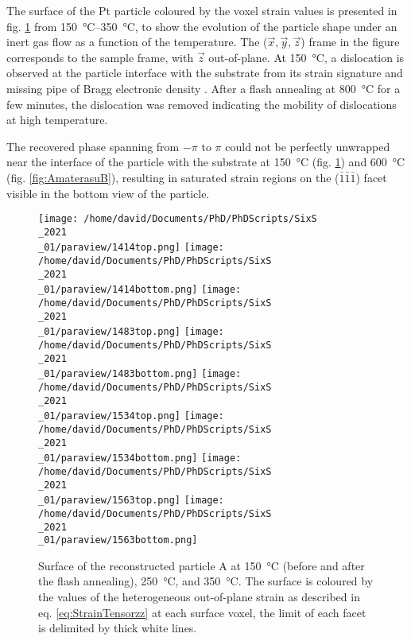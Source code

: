 The surface of the Pt particle coloured by the voxel strain values is presented in fig. \ref{fig:AmaterasuA} from \qtyrange{150}{350}{\degreeCelsius}, to show the evolution of the particle shape under an inert gas flow as a function of the temperature.
The ($\vec{x}, \vec{y}, \vec{z}$) frame in the figure corresponds to the sample frame, with $\vec{z}$ out-of-plane.
At \qty{150}{\degreeCelsius}, a dislocation is observed at the particle interface with the substrate from its strain signature and missing pipe of Bragg electronic density \parencite{Dupraz2015}.
After a flash annealing at \qty{800}{\degreeCelsius} for a few minutes, the dislocation was removed indicating the mobility of dislocations at high temperature.

The recovered phase spanning from $-\pi$ to $\pi$ could not be perfectly unwrapped near the interface of the particle with the substrate at \qty{150}{\degreeCelsius} (fig. \ref{fig:AmaterasuA}) and \qty{600}{\degreeCelsius} (fig. \ref{fig:AmaterasuB}), resulting in saturated strain regions on the ($\bar{1}\bar{1}\bar{1}$) facet visible in the bottom view of the particle.

\begin{figure}[!htb]
    \centering
    \texttt{[image: /home/david/Documents/PhD/PhDScripts/SixS\\\_2021\\\_01/paraview/1414top.png]}
    \texttt{[image: /home/david/Documents/PhD/PhDScripts/SixS\\\_2021\\\_01/paraview/1414bottom.png]}
    \texttt{[image: /home/david/Documents/PhD/PhDScripts/SixS\\\_2021\\\_01/paraview/1483top.png]}
    \texttt{[image: /home/david/Documents/PhD/PhDScripts/SixS\\\_2021\\\_01/paraview/1483bottom.png]}
    \texttt{[image: /home/david/Documents/PhD/PhDScripts/SixS\\\_2021\\\_01/paraview/1534top.png]}
    \texttt{[image: /home/david/Documents/PhD/PhDScripts/SixS\\\_2021\\\_01/paraview/1534bottom.png]}
    \texttt{[image: /home/david/Documents/PhD/PhDScripts/SixS\\\_2021\\\_01/paraview/1563top.png]}
    \texttt{[image: /home/david/Documents/PhD/PhDScripts/SixS\\\_2021\\\_01/paraview/1563bottom.png]}
    \caption{
        Surface of the reconstructed particle A at \qty{150}{\degreeCelsius} (before and after the flash annealing), \qty{250}{\degreeCelsius}, and \qty{350}{\degreeCelsius}.
        The surface is coloured by the values of the heterogeneous out-of-plane strain as described in eq. \ref{eq:StrainTensorzz} at each surface voxel, the limit of each facet is delimited by thick white lines.
    }
    \label{fig:AmaterasuA}
\end{figure}

